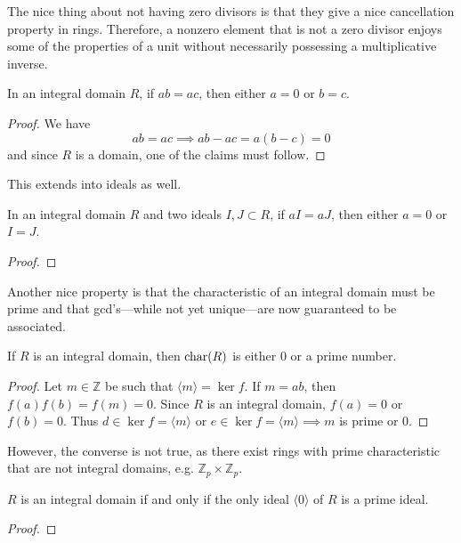   The nice thing about not having zero divisors is that they give a nice cancellation property in rings. Therefore, a nonzero element that is not a zero divisor enjoys some of the properties of a unit without necessarily possessing a multiplicative inverse. 

  \begin{lemma}
    In an integral domain $R$, if $ab = ac$, then either $a = 0$ or $b = c$. 
  \end{lemma}
  \begin{proof}
    We have 
    \begin{equation}
      ab = ac \implies ab - ac = a(b - c) = 0
    \end{equation}
    and since $R$ is a domain, one of the claims must follow. 
  \end{proof}

  This extends into ideals as well. 

  \begin{theorem}
    In an integral domain $R$ and two ideals $I, J \subset R$, if $aI = aJ$, then either $a = 0$ or $I = J$. 
  \end{theorem}
  \begin{proof}
    
  \end{proof}

  Another nice property is that the characteristic of an integral domain must be prime and that gcd's---while not yet unique---are now guaranteed to be associated. 

  \begin{corollary}
    If $R$ is an integral domain, then $\Char(R)$ is either $0$ or a prime number. 
  \end{corollary}
  \begin{proof}
    Let $m \in \mathbb{Z}$ be such that $\langle m \rangle = \ker{f}$. If $m = ab$, then $f(a) f(b) = f(m) = 0$. Since $R$ is an integral domain, $f(a) = 0$ or $f(b) = 0$. Thus $d \in \ker{f} = \langle m \rangle$ or $e \in \ker{f} = \langle m \rangle \implies m$ is prime or $0$. 
  \end{proof}

  However, the converse is not true, as there exist rings with prime characteristic that are not integral domains, e.g. $\mathbb{Z}_p \times \mathbb{Z}_p$. 

  \begin{theorem}
    $R$ is an integral domain if and only if the only ideal $\langle 0 \rangle$ of $R$ is a prime ideal. 
  \end{theorem}
  \begin{proof}
    
  \end{proof}

